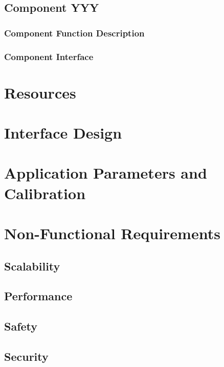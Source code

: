 \documentclass[11pt,letterpaper]{report}
\begin{document}
\section{Component YYY}
\subsection{Component Function Description}
\subsection{Component Interface}

\chapter{Resources}
\chapter{Interface Design}
\chapter{Application Parameters and Calibration}
\chapter{Non-Functional Requirements}
\section{Scalability}
\section{Performance}
\section{Safety}
\section{Security}
\end{document}
